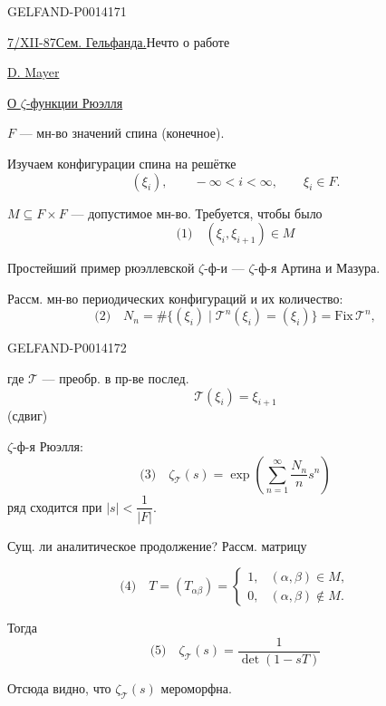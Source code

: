 \begin{GelfandAdjacentEvidence}{GELFAND-P001417}{1}

\uline{7/XII-87}\qquad \uline{Сем. Гельфанда.}\qquad Нечто о работе

\uline{D. Mayer}\qquad {}

\uline{О \(\zeta\)-функции Рюэлля}

\(F\) — мн-во значений спина (конечное).

Изучаем конфигурации спина на решётке
\[
(\xi_i),\qquad -\infty<i<\infty,\qquad \xi_i\in F.
\]

\(M\subseteq F\times F\) — допустимое мн-во. Требуется, чтобы было
\[
\text{(1)}\quad (\xi_i,\xi_{i+1})\in M
\]

Простейший пример рюэллевской \(\zeta\)-ф-и — \(\zeta\)-ф-я Артина и Мазура.

Рассм. мн-во периодических конфигураций и их количество:
\[
\text{(2)}\quad N_n=\#\{(\xi_i)\mid\mathcal T^n(\xi_i)=(\xi_i)\}
=\mathrm{Fix}\,\mathcal T^n,
\]
\end{GelfandAdjacentEvidence}
\begin{GelfandAdjacentEvidence}{GELFAND-P001417}{2}

где \(\mathcal T\) — преобр. в пр-ве послед.
\[
\mathcal T(\xi_i)=\xi_{i+1}
\]
(сдвиг)

\(\zeta\)-ф-я Рюэлля:
\[
\text{(3)}\quad
\zeta_{\mathcal T}(s)=\exp\left(\sum_{n=1}^{\infty}\frac{N_n}{n}s^n\right)
\]
ряд сходится при \(|s|<\dfrac{1}{|F|}\).

Сущ. ли аналитическое продолжение? Рассм. матрицу
\end{GelfandAdjacentEvidence}

\[
\text{(4)}\quad T=(T_{\alpha\beta})=
\begin{cases}
1,&(\alpha,\beta)\in M,\\
0,&(\alpha,\beta)\notin M.
\end{cases}
\]

Тогда
\[
\text{(5)}\quad\zeta_{\mathcal T}(s)=\frac{1}{\det(1-sT)}
\]

Отсюда видно, что \(\zeta_{\mathcal T}(s)\) мероморфна.

